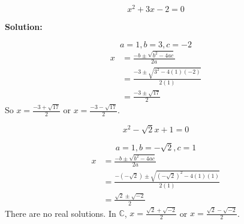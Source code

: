 \begin{tcolorbox}[title=Problem 1, breakable]
    \[x^2 + 3x - 2 = 0\]
\end{tcolorbox}

\textbf{Solution:}

\[a = 1, b = 3, c = -2\]
\begin{align*}
    x &= \frac{-b \pm \sqrt{b^2 - 4ac}}{2a} \\
      &= \frac{-3 \pm \sqrt{3^2 - 4(1)(-2)}}{2(1)} \\
      &= \frac{-3 \pm \sqrt{17}}{2}
\end{align*}
So $x = \frac{-3 + \sqrt{17}}{2}$ or $x = \frac{-3 - \sqrt{17}}{2}$.

\begin{tcolorbox}[title=Problem 11, breakable]
    \[x^2 - \sqrt{2}x + 1 = 0\]
\end{tcolorbox}

\[a = 1, b = -\sqrt{2}, c = 1\]
\begin{align*}
    x &= \frac{-b \pm \sqrt{b^2 - 4ac}}{2a} \\
      &= \frac{-(-\sqrt{2}) \pm \sqrt{(-\sqrt{2})^2 - 4(1)(1)}}{2(1)} \\
      &= \frac{\sqrt{2} \pm \sqrt{-2}}{2}
\end{align*}
There are no real solutions.
In $\mathbb{C}$, $x = \frac{\sqrt{2} + \sqrt{-2}}{2}$ or $x = \frac{\sqrt{2} - \sqrt{-2}}{2}$.